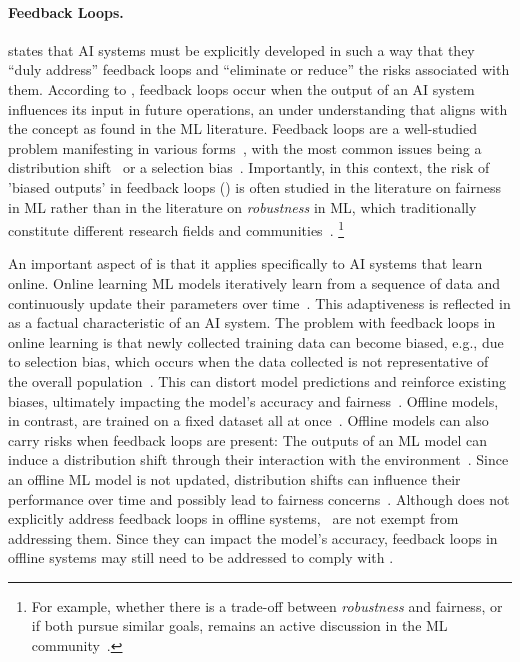 \paragraph{Feedback Loops.}
% 
 states that AI systems must be explicitly developed in such a way that they ``duly address'' feedback loops and ``eliminate or reduce'' the risks associated with them.
%
According to , feedback loops occur when the output of an AI system influences its input in future operations, an under
%
understanding that aligns with the concept as found in the ML literature.
%
Feedback loops are a well-studied problem manifesting in various forms~\cite{pagan2023classification}, with the most common issues being a distribution shift~\cite{perdomo2020performative} or a selection bias~\cite{kilbertus2020fair, lum2016predict}.
%
Importantly, in this context, the risk of 'biased outputs' in feedback loops () is often studied in the literature on fairness in ML rather than in the literature on \emph{robustness} in ML, which traditionally constitute different research fields and communities~\citep{lee2021machine}.
\footnote{For example, whether there is a trade-off between \emph{robustness} and fairness, or if both pursue similar goals, remains an active discussion in the ML community~\citep{lee2021machine, xu2021robust, pruksachatkun2021does}.
}

An important aspect of  is that it applies specifically to AI systems that learn online. 
%
Online learning ML models iteratively learn from a sequence of data and continuously update their parameters over time~\cite{hoi2021online}.
%
This adaptiveness is reflected in  as a factual characteristic of an AI system.
%
The problem with feedback loops in online learning is that newly collected training data can become biased, e.g., due to selection bias, which occurs when the data collected is not representative of the overall population~\cite{zadrozny2004learning, liu2014robust}. This can distort model predictions and reinforce existing biases, ultimately impacting the model's accuracy and fairness~\cite{kilbertus2020fair, bechavod2019equal, rateike2022don}.
%
Offline models, in contrast, are trained on a fixed dataset all at once~\cite{hoi2021online}.
%
Offline models can also carry risks when feedback loops are present: The outputs of an ML model can induce a distribution shift through their interaction with the environment~\cite{d2020fairness, zhang2020fair, liu2018delayed}. Since an offline ML model is not updated, distribution shifts can influence their performance over time and possibly lead to fairness concerns~\cite{liu2018delayed}. 
Although  does not explicitly address feedback loops in offline systems, \HRAIS\ are not exempt from addressing them.
% 
Since they can impact the model’s accuracy, feedback loops in offline systems may still need to be addressed to comply with .
%


